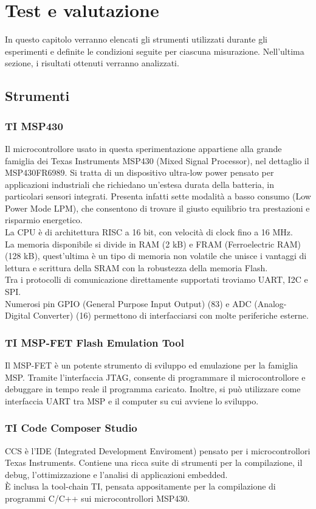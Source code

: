 \documentclass[target=bach,aauheader=,style=]{thud}
\begin{document}
\chapter{Test e valutazione}
In questo capitolo verranno elencati gli strumenti utilizzati durante gli esperimenti e definite le condizioni seguite per ciascuna misurazione. Nell'ultima sezione, i risultati ottenuti verranno analizzati.
	\section{Strumenti}
		\subsection{TI MSP430}
		Il microcontrollore usato in questa sperimentazione appartiene alla grande famiglia dei Texas Instruments MSP430 (Mixed Signal Processor), nel dettaglio il MSP430FR6989. Si tratta di un dispositivo ultra-low power pensato per applicazioni industriali che richiedano un'estesa durata della batteria, in particolari sensori integrati. Presenta infatti sette modalità a basso consumo (Low Power Mode LPM), che consentono di trovare il giusto equilibrio tra prestazioni e risparmio energetico.\\
		La CPU è di architettura RISC a 16 bit, con velocità di clock fino a 16 MHz.\\
		La memoria disponibile si divide in RAM (2 kB) e FRAM (Ferroelectric RAM) (128 kB), quest'ultima è un tipo di memoria non volatile che unisce i vantaggi di lettura e scrittura della SRAM con la robustezza della memoria Flash.\\
		Tra i protocolli di comunicazione direttamente supportati troviamo UART, I2C e SPI.\\
		Numerosi pin GPIO (General Purpose Input Output) (83) e ADC (Analog-Digital Converter) (16) permettono di interfacciarsi con molte periferiche esterne\cite{mspuser,mspdatas}.
		
		\subsection{TI MSP-FET Flash Emulation Tool}
		Il MSP-FET è un potente strumento di sviluppo ed emulazione per la famiglia MSP. Tramite l'interfaccia JTAG, consente di programmare il microcontrollore e debuggare in tempo reale il programma caricato. Inoltre, si può utilizzare come interfaccia UART tra MSP e il computer su cui avviene lo sviluppo.
		
		\subsection{TI Code Composer Studio}
		CCS è l'IDE (Integrated Development Enviroment) pensato per i microcontrollori Texas Instruments. Contiene una ricca suite di strumenti per la compilazione, il debug, l'ottimizzazione e l'analisi di applicazioni embedded.\\
	    È inclusa la tool-chain TI, pensata appositamente per la compilazione di programmi C/C++ sui microcontrollori MSP430.
		
\end{document}
